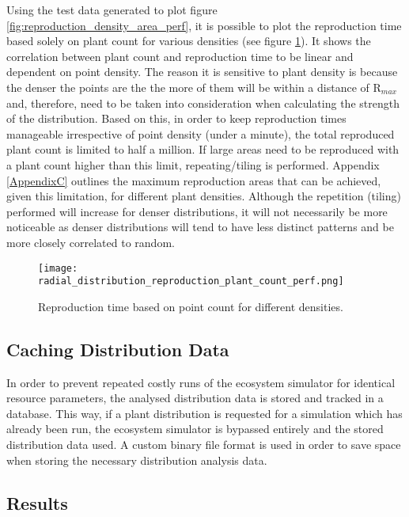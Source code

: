 Using the test data generated to plot figure \ref{fig:reproduction_density_area_perf}, it is possible to plot the reproduction time based solely on plant count for various densities (see figure \ref{fig:reproduction_plant_count_perf}). It shows the correlation between plant count and reproduction time to be linear and dependent on point density. The reason it is sensitive to plant density is because the denser the points are the the more of them will be within a distance of R$_{max}$ and, therefore, need to be taken into consideration when calculating the strength of the distribution. Based on this, in order to keep reproduction times manageable irrespective of point density (under a minute), the total reproduced plant count is limited to half a million. If large areas need to be reproduced with a plant count higher than this limit, repeating/tiling is performed. Appendix \ref{AppendixC} outlines the maximum reproduction areas that can be achieved, given this limitation, for different plant densities. Although the repetition (tiling) performed will increase for denser distributions, it will not necessarily be more noticeable as denser distributions will tend to have less distinct patterns and be more closely correlated to random.\\

\begin{figure}
\center
	\texttt{[image: radial\_distribution\_reproduction\_plant\_count\_perf.png]}
	\caption{ Reproduction time based on point count for different densities.}	
	\label{fig:reproduction_plant_count_perf}
\end{figure}

\subsection{Caching Distribution Data}

In order to prevent repeated costly runs of the ecosystem simulator for identical resource parameters, the analysed distribution data is stored and tracked in a database. This way, if a plant distribution is requested for a simulation which has already been run, the ecosystem simulator is bypassed entirely and the stored distribution data used. A custom binary file format is used in order to save space when storing the necessary distribution analysis data.

\subsection{Results} \label{subsec:dist_anal_results}

